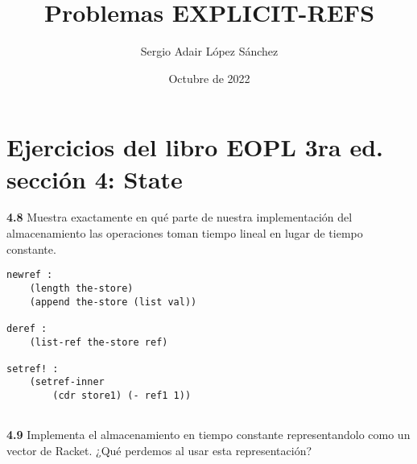 \documentclass{article}
\title{Problemas EXPLICIT-REFS}
\author{Sergio Adair López Sánchez}
\date{Octubre de 2022}
\begin{document}
\maketitle

\section{Ejercicios del libro EOPL 3ra ed. sección 4: State}

\textbf{4.8}  Muestra exactamente en qué parte de nuestra implementación del almacenamiento las operaciones toman tiempo lineal en lugar de tiempo constante.

\begin{verbatim}
newref :
    (length the-store)
    (append the-store (list val))

deref :
    (list-ref the-store ref)

setref! :
    (setref-inner
        (cdr store1) (- ref1 1))
        
\end{verbatim}
\textbf{4.9}  Implementa el almacenamiento en tiempo constante representandolo como un vector de Racket. ¿Qué perdemos al usar esta representación?
\end{document}
